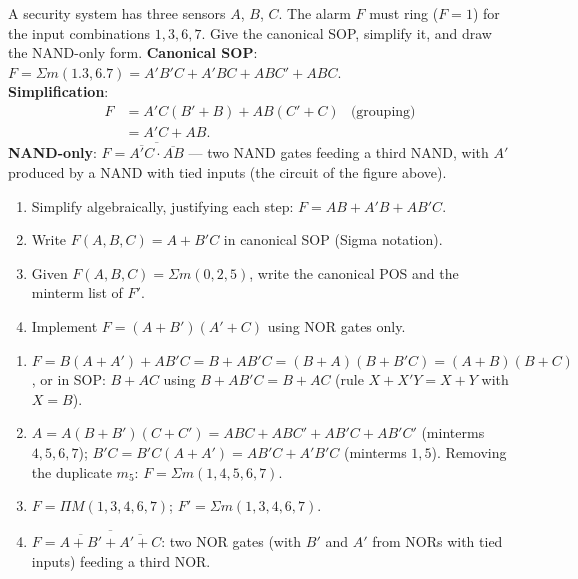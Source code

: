 \documentclass[11pt]{article}
\begin{document}
\begin{exoresolu}
A security system has three sensors $A$, $B$, $C$. The alarm $F$ must ring ($F=1$) for the input combinations $1, 3, 6, 7$. Give the canonical SOP, simplify it, and draw the NAND-only form.
\tcblower
\textbf{Canonical SOP}: $F = \Sigma m(1.3,6.7) = A'B'C + A'BC + ABC' + ABC$.\\
\textbf{Simplification}:
\begin{align*}
F &= A'C(B'+B) + AB(C'+C) & \text{(grouping)}\\
&= A'C + AB. &
\end{align*}
\textbf{NAND-only}: $F = \overline{\overline{A'C}\cdot\overline{AB}}$ — two NAND gates feeding a third NAND, with $A'$ produced by a NAND with tied inputs (the circuit of the figure above).
\end{exoresolu}

\begin{exercice}[Practice]
\begin{enumerate}
\item Simplify algebraically, justifying each step: $F = AB + A'B + AB'C$.
\item Write $F(A,B,C) = A + B'C$ in canonical SOP (Sigma notation).
\item Given $F(A,B,C) = \Sigma m(0,2,5)$, write the canonical POS and the minterm list of $F'$.
\item Implement $F = (A+B')(A'+C)$ using NOR gates only.
\end{enumerate}
\end{exercice}

\begin{corrige}[Exercise 1]
\begin{enumerate}
\item $F = B(A+A') + AB'C = B + AB'C = (B+A)(B+B'C) = (A+B)(B+C)$, or in SOP: $B+AC$ using $B+AB'C=B+AC$ (rule $X+X'Y=X+Y$ with $X=B$).
\item $A = A(B+B')(C+C') = ABC+ABC'+AB'C+AB'C'$ (minterms $4,5,6,7$); $B'C = B'C(A+A') = AB'C + A'B'C$ (minterms $1,5$). Removing the duplicate $m_5$: $F=\Sigma m(1,4,5,6,7)$.
\item $F = \Pi M(1,3,4,6,7)$; $F' = \Sigma m(1,3,4,6,7)$.
\item $F = \overline{\overline{A+B'}+\overline{A'+C}}$: two NOR gates (with $B'$ and $A'$ from NORs with tied inputs) feeding a third NOR.
\end{enumerate}
\end{corrige}
\end{document}
